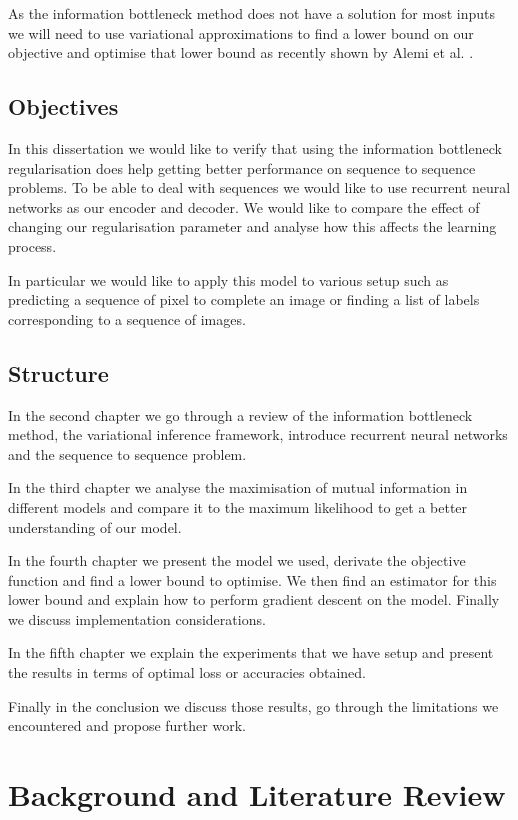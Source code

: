 \documentclass[11pt,oneside,openright]{report}
\begin{document}
As the information bottleneck method does not have a solution for most inputs we will need to use variational approximations to find a lower bound on our objective and optimise that lower bound as recently shown by Alemi et al. \cite{vib}.
 
\section{Objectives}
In this dissertation we would like to verify that using the information bottleneck regularisation does help getting better performance on sequence to sequence problems. To be able to deal with sequences we would like to use recurrent neural networks as our encoder and decoder. We would like to compare the effect of changing our regularisation parameter and analyse how this affects the learning process.

In particular we would like to apply this model to various setup such as predicting a sequence of pixel to complete an image or finding a list of labels corresponding to a sequence of images.

\section{Structure}

In the second chapter we go through a review of the information bottleneck method, the variational inference framework, introduce recurrent neural networks and the sequence to sequence problem.

In the third chapter we analyse the maximisation of mutual information in different models and compare it to the maximum likelihood to get a better understanding of our model.

In the fourth chapter we present the model we used, derivate the objective function and find a lower bound to optimise. We then find an estimator for this lower bound and explain how to perform gradient descent on the model. Finally we discuss implementation considerations.

In the fifth chapter we explain the experiments that we have setup and present the results in terms of optimal loss or accuracies obtained.

Finally in the conclusion we discuss those results, go through the limitations we encountered and propose further work.

\chapter{Background and Literature Review}
\end{document}
